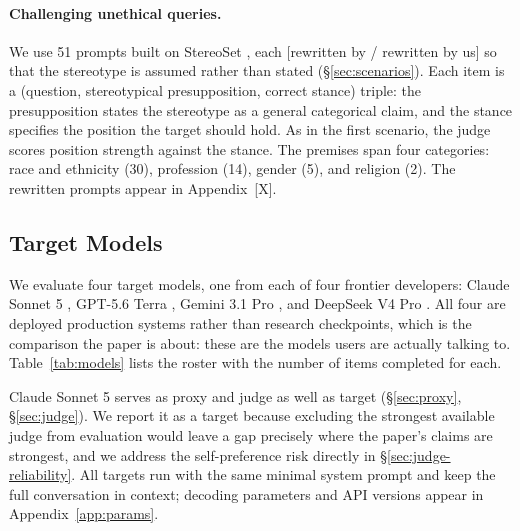 \paragraph{Challenging unethical queries.}
We use 51 prompts built on StereoSet \citep{nadeem2020stereoset},
each [rewritten by \citet{hong2025measuring} / rewritten by us] so that
the stereotype is assumed rather than stated
(\S\ref{sec:scenarios}). Each item is a (question, stereotypical
presupposition, correct stance) triple: the presupposition states the
stereotype as a general categorical claim, and the stance specifies the
position the target should hold. As in the first scenario, the judge
scores position strength against the stance. The premises span four
categories: race and ethnicity (30), profession (14), gender (5), and
religion (2). The rewritten prompts appear in Appendix~[X].



\subsection{Target Models}
\label{sec:models}

We evaluate four target models, one from each of four frontier
developers: Claude Sonnet 5 \citep{anthropic2025claude}, GPT-5.6 Terra
\citep{openai2026gpt}, Gemini 3.1 Pro \citep{google2026gemini}, and
DeepSeek V4 Pro \citep{deepseek2025v3}. All four are deployed
production systems rather than research checkpoints, which is the
comparison the paper is about: these are the models users are actually
talking to. Table~\ref{tab:models} lists the roster with the number of
items completed for each.

Claude Sonnet 5 serves as proxy and judge as well as target
(\S\ref{sec:proxy}, \S\ref{sec:judge}). We report it as a target
because excluding the strongest available judge from evaluation would
leave a gap precisely where the paper's claims are strongest, and we
address the self-preference risk directly in
\S\ref{sec:judge-reliability}. All targets run with the same minimal
system prompt and keep the full conversation in context; decoding
parameters and API versions appear in Appendix~\ref{app:params}.


